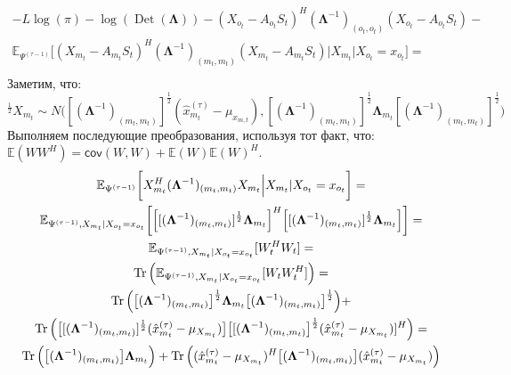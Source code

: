 \documentclass[11pt]{article}
\newcommand{\Expect}{\mathbb{E}}
\newcommand{\Cov}{\mathsf{cov}}
\DeclareMathOperator{\Det}{Det}
\begin{document}
\begin{equation*}
\begin{gathered}
-L \log(\pi) - \log (\Det(\mathbf{\Lambda}))  - (X_{o_t} - A_{o_t}S_t)^H (\mathbf{\Lambda}^{-1})_{(o_t, o_t)} (X_{o_t} - A_{o_t}S_t) - \\ \Expect_{\Psi^{(\tau-1)}} \bigg[ (X_{m_t} - A_{m_t}S_t)^H (\mathbf{\Lambda}^{-1})_{(m_t, m_t)} (X_{m_t} - A_{m_t}S_t) 
\Big|X_{m_t}|X_{o_t}=x_{o_t}\bigg] = \\
\end{gathered}
\end{equation*}
Заметим, что: 
\begin{equation*}
[(\mathbf{\Lambda}^{-1})_{(m_t, m_t)}]^{\frac{1}{2}}X_{m_t} \sim N\Big([(\mathbf{\Lambda}^{-1})_{(m_t, m_t)}]^{\frac{1}{2}}(\hat{x}_{m_t}^{(\tau)} - \mu_{x_{m,t}}),[(\mathbf{\Lambda}^{-1})_{(m_t, m_t)}]^{\frac{1}{2}}\mathbf{\Lambda}_{m_t}[(\mathbf{\Lambda}^{-1})_{(m_t, m_t)}]^{\frac{1}{2}}\Big)
\end{equation*}
Выполняем последующие преобразования, используя тот факт, что: $\Expect(WW^H)=\Cov(W,W)+\Expect(W)\Expect(W)^H$.
\begin{equation*}
\begin{gathered}
\Expect_{\Psi^{(\tau-1)}}\bigg[X_{m_t}^H (\mathbf{\Lambda}^{-1})_{(m_t, m_t)}X_{m_t}   \Big|X_{m_t}|X_{o_t}=x_{o_t}\bigg] = \\
\Expect_{\Psi^{(\tau-1)},X_{m_t}|X_{o_t}=x_{o_t}}\bigg[\Big[[(\mathbf{\Lambda}^{-1})_{(m_t, m_t)}]^{\frac{1}{2}}\mathbf{\Lambda}_{m_t}\Big]^H\Big[[(\mathbf{\Lambda}^{-1})_{(m_t, m_t)}]^{\frac{1}{2}}\mathbf{\Lambda}_{m_t}\Big]\bigg] = \\
\Expect_{\Psi^{(\tau-1)},X_{m_t}|X_{o_t}=x_{o_t}}[W_t^HW_t] = \\
\Tr \Big( \Expect_{\Psi^{(\tau-1)},X_{m_t}|X_{o_t}=x_{o_t}}[W_tW_t^H] \Big) = \\
\Tr \Big( \big[(\mathbf{\Lambda}^{-1})_{(m_t, m_t)}\big]^{\frac{1}{2}}\mathbf{\Lambda}_{m_t}\big[(\mathbf{\Lambda}^{-1})_{(m_t, m_t)}\big]^{\frac{1}{2}} \Big) + \\ \Tr \Big( \big[[(\mathbf{\Lambda}^{-1})_{(m_t, m_t)}]^{\frac{1}{2}}(\hat{x}_{m_t}^{(\tau)} - \mu_{X_{m_t}})\big]\big[[(\mathbf{\Lambda}^{-1})_{(m_t, m_t)}\big]^{\frac{1}{2}}(\hat{x}_{m_t}^{(\tau)} - \mu_{X_{m_t}})]^H \Big)= \\
\Tr \Big( \big[(\mathbf{\Lambda}^{-1})_{(m_t, m_t)}\big]\mathbf{\Lambda}_{m_t} \Big) + \Tr \Big((\hat{x}_{m_t}^{(\tau)} - \mu_{X_{m_t}})^H\big[(\mathbf{\Lambda}^{-1})_{(m_t, m_t)}\big](\hat{x}_{m_t}^{(\tau)} - \mu_{X_{m_t}}) \Big) \\
\end{gathered}
\end{equation*}
\end{document}
